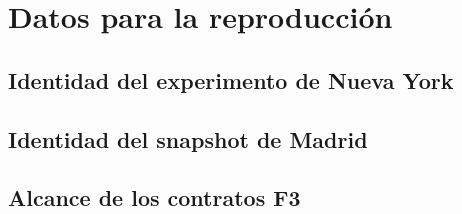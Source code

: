 \chapter{Datos para la reproducción}
\label{anx:documentacion}

\section{Identidad del experimento de Nueva York}

\section{Identidad del snapshot de Madrid}

\section{Alcance de los contratos F3}
